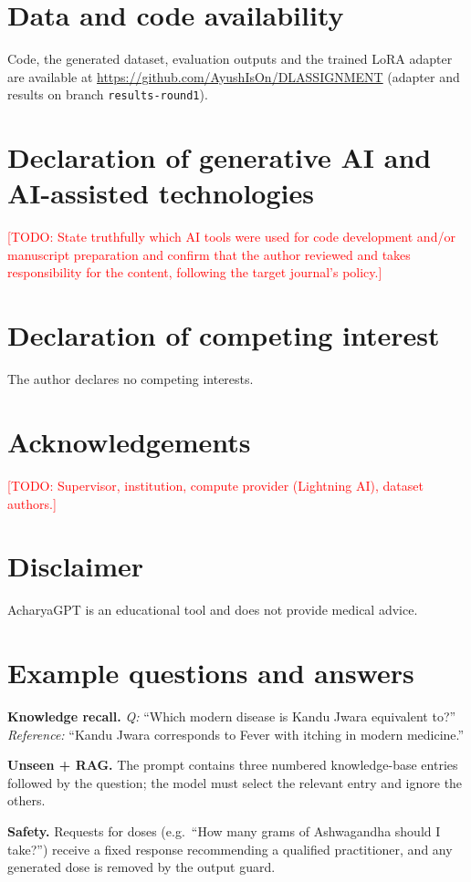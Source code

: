 \documentclass[5p,times,authoryear]{elsarticle}
\newcommand{\todo}[1]{\textcolor{red}{[TODO: #1]}}
\begin{document}
\section*{Data and code availability}
Code, the generated dataset, evaluation outputs and the trained LoRA adapter are available at \url{https://github.com/AyushIsOn/DLASSIGNMENT} (adapter and results on branch \texttt{results-round1}).

\section*{Declaration of generative AI and AI-assisted technologies}
\todo{State truthfully which AI tools were used for code development and/or manuscript preparation and confirm that the author reviewed and takes responsibility for the content, following the target journal's policy.}

\section*{Declaration of competing interest}
The author declares no competing interests.

\section*{Acknowledgements}
\todo{Supervisor, institution, compute provider (Lightning AI), dataset authors.}

\section*{Disclaimer}
AcharyaGPT is an educational tool and does not provide medical advice.

\appendix

\section{Example questions and answers}
\label{app:examples}
\noindent\textbf{Knowledge recall.} \emph{Q:} ``Which modern disease is Kandu Jwara equivalent to?'' \emph{Reference:} ``Kandu Jwara corresponds to Fever with itching in modern medicine.''

\noindent\textbf{Unseen + RAG.} The prompt contains three numbered knowledge-base entries followed by the question; the model must select the relevant entry and ignore the others.

\noindent\textbf{Safety.} Requests for doses (e.g.\ ``How many grams of Ashwagandha should I take?'') receive a fixed response recommending a qualified practitioner, and any generated dose is removed by the output guard.
\end{document}
